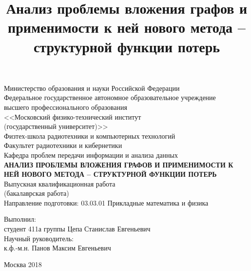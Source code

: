 \documentclass[12pt,a4paper]{extarticle}
\title{Анализ проблемы вложения графов и применимости к ней нового метода -- структурной функции потерь}
\begin{document}
    \begin{titlepage}
        \clearpage
        \pagestyle{empty}

        \begin{center}
            \textrm{Министерство образования и науки Российской Федерации}
            \\[5mm]
            Федеральное государственное автономное образовательное учреждение\\
            высшего профессионального образования\\
            <<Московский физико-технический институт\\
            {(государственный университет)}>>\\[5mm]
            Физтех-школа радиотехники и компьютерных технологий\\[5mm]
            Факультет радиотехники и кибернетики\\[5mm]
            Кафедра проблем передачи информации и анализа данных\\[40mm]
            \textbf{АНАЛИЗ ПРОБЛЕМЫ ВЛОЖЕНИЯ ГРАФОВ И ПРИМЕНИМОСТИ К НЕЙ НОВОГО МЕТОДА -- СТРУКТУРНОЙ ФУНКЦИИ ПОТЕРЬ}
            \\[8mm]
            \textrm{Выпускная квалификационная работа}
            \\
            (бакалаврская работа)\\[7mm]

            Направление подготовки: 03.03.01 Прикладные математика и физика\\[40mm]
        \end{center}

        \noindent Выполнил:\\
        студент 411а группы \hspace{0.9cm} \underline{\hspace{4cm}} Цепа Станислав Евгеньевич\\[2mm]

        \noindent Научный руководитель:\\
        к.ф.-м.н. \hspace{3.1cm} \underline{\hspace{4cm}} Панов Максим Евгеньевич
        \\[20mm]

        \begin{center}
            Москва 2018
        \end{center}

    \end{titlepage}
\end{document}
